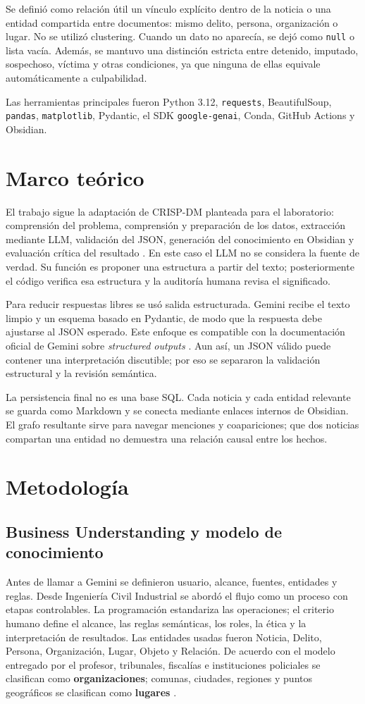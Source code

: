 \documentclass[conference]{IEEEtran}
\begin{document}
Se definió como relación útil un vínculo explícito dentro de la noticia o una entidad compartida entre documentos: mismo delito, persona, organización o lugar. No se utilizó clustering. Cuando un dato no aparecía, se dejó como \texttt{null} o lista vacía. Además, se mantuvo una distinción estricta entre detenido, imputado, sospechoso, víctima y otras condiciones, ya que ninguna de ellas equivale automáticamente a culpabilidad.

Las herramientas principales fueron Python 3.12, \texttt{requests}, BeautifulSoup, \texttt{pandas}, \texttt{matplotlib}, Pydantic, el SDK \texttt{google-genai}, Conda, GitHub Actions y Obsidian.

\section{Marco teórico}
El trabajo sigue la adaptación de CRISP-DM planteada para el laboratorio: comprensión del problema, comprensión y preparación de los datos, extracción mediante LLM, validación del JSON, generación del conocimiento en Obsidian y evaluación crítica del resultado \cite{bekios2026}. En este caso el LLM no se considera la fuente de verdad. Su función es proponer una estructura a partir del texto; posteriormente el código verifica esa estructura y la auditoría humana revisa el significado.

Para reducir respuestas libres se usó salida estructurada. Gemini recibe el texto limpio y un esquema basado en Pydantic, de modo que la respuesta debe ajustarse al JSON esperado. Este enfoque es compatible con la documentación oficial de Gemini sobre \emph{structured outputs} \cite{googleStructured}. Aun así, un JSON válido puede contener una interpretación discutible; por eso se separaron la validación estructural y la revisión semántica.

La persistencia final no es una base SQL. Cada noticia y cada entidad relevante se guarda como Markdown y se conecta mediante enlaces internos de Obsidian. El grafo resultante sirve para navegar menciones y coapariciones; que dos noticias compartan una entidad no demuestra una relación causal entre los hechos.

\section{Metodología}
\subsection{Business Understanding y modelo de conocimiento}
Antes de llamar a Gemini se definieron usuario, alcance, fuentes, entidades y reglas. Desde Ingeniería Civil Industrial se abordó el flujo como un proceso con etapas controlables. La programación estandariza las operaciones; el criterio humano define el alcance, las reglas semánticas, los roles, la ética y la interpretación de resultados. Las entidades usadas fueron Noticia, Delito, Persona, Organización, Lugar, Objeto y Relación. De acuerdo con el modelo entregado por el profesor, tribunales, fiscalías e instituciones policiales se clasifican como \textbf{organizaciones}; comunas, ciudades, regiones y puntos geográficos se clasifican como \textbf{lugares} \cite{bekios2026}.
\end{document}
